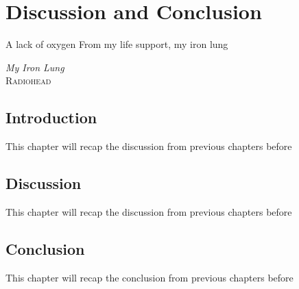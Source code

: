 \chapter{Discussion and Conclusion} \label{sec:discussion_and_conclusion}
    \vspace*{\fill}
    \setlength{\epigraphwidth}{0.4\linewidth}
    \renewcommand{\epigraphflush}{flushright}
    \renewcommand{\epigraphsize}{\footnotesize}
    \epigraph{A lack of oxygen\newline
              From my life support, my iron lung}%
              {\textit{My Iron Lung}\\ \textsc{Radiohead}}
    
    \newpage

    \section{Introduction} \label{sec:discussion_and_conclusion_introduction}
        This chapter will recap the discussion from previous chapters before 
    
    \section{Discussion} \label{sec:discussion_and_conclusion_discussion}
        This chapter will recap the discussion from previous chapters before 

    \section{Conclusion} \label{sec:discussion_and_conclusion_conclusion}
        This chapter will recap the conclusion from previous chapters before 
